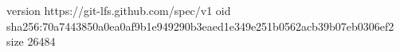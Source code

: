 version https://git-lfs.github.com/spec/v1
oid sha256:70a7443850a0ea0af9b1e949290b3eaed1e349e251b0562acb39b07eb0306ef2
size 26484
